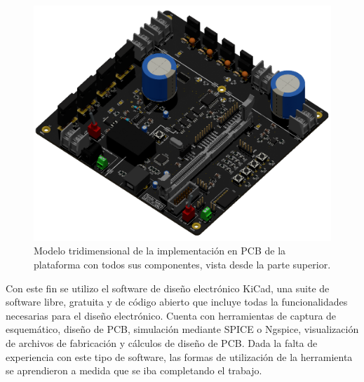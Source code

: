 \begin{figure}[h]
    \centering
    \includegraphics[scale=0.3]{Imagenes/PCB 3D Raytracing.png}
    \caption{Modelo tridimensional de la implementación en PCB de la plataforma
    con todos sus componentes, vista desde la parte superior.}
    \label{fig:plataforma_det}
\end{figure}

Con este fin se utilizo el software de diseño electrónico {\Medium KiCad}, una suite de software libre, gratuita y de código abierto que incluye todas la funcionalidades necesarias para el diseño electrónico. Cuenta con herramientas de captura de esquemático, diseño de PCB, simulación mediante SPICE o Ngspice, visualización de archivos de fabricación y cálculos de diseño de PCB. Dada la falta de experiencia con este tipo de software, las formas de utilización de la herramienta se aprendieron a medida que se iba completando el trabajo.\\

\newpage



\divider

